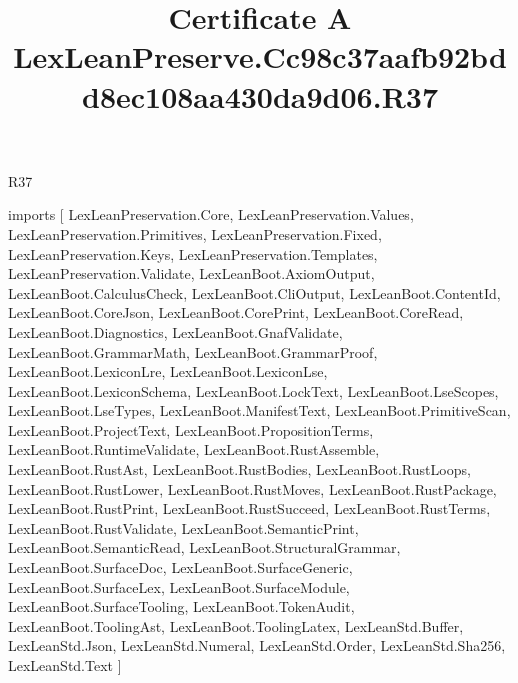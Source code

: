 \begin{lexlean}{R37}
\title{Certificate A LexLeanPreserve.Cc98c37aafb92bdd8ec108aa430da9d06.R37}
\begin{coremodule}
imports [
  LexLeanPreservation.Core,
  LexLeanPreservation.Values,
  LexLeanPreservation.Primitives,
  LexLeanPreservation.Fixed,
  LexLeanPreservation.Keys,
  LexLeanPreservation.Templates,
  LexLeanPreservation.Validate,
  LexLeanBoot.AxiomOutput,
  LexLeanBoot.CalculusCheck,
  LexLeanBoot.CliOutput,
  LexLeanBoot.ContentId,
  LexLeanBoot.CoreJson,
  LexLeanBoot.CorePrint,
  LexLeanBoot.CoreRead,
  LexLeanBoot.Diagnostics,
  LexLeanBoot.GnafValidate,
  LexLeanBoot.GrammarMath,
  LexLeanBoot.GrammarProof,
  LexLeanBoot.LexiconLre,
  LexLeanBoot.LexiconLse,
  LexLeanBoot.LexiconSchema,
  LexLeanBoot.LockText,
  LexLeanBoot.LseScopes,
  LexLeanBoot.LseTypes,
  LexLeanBoot.ManifestText,
  LexLeanBoot.PrimitiveScan,
  LexLeanBoot.ProjectText,
  LexLeanBoot.PropositionTerms,
  LexLeanBoot.RuntimeValidate,
  LexLeanBoot.RustAssemble,
  LexLeanBoot.RustAst,
  LexLeanBoot.RustBodies,
  LexLeanBoot.RustLoops,
  LexLeanBoot.RustLower,
  LexLeanBoot.RustMoves,
  LexLeanBoot.RustPackage,
  LexLeanBoot.RustPrint,
  LexLeanBoot.RustSucceed,
  LexLeanBoot.RustTerms,
  LexLeanBoot.RustValidate,
  LexLeanBoot.SemanticPrint,
  LexLeanBoot.SemanticRead,
  LexLeanBoot.StructuralGrammar,
  LexLeanBoot.SurfaceDoc,
  LexLeanBoot.SurfaceGeneric,
  LexLeanBoot.SurfaceLex,
  LexLeanBoot.SurfaceModule,
  LexLeanBoot.SurfaceTooling,
  LexLeanBoot.TokenAudit,
  LexLeanBoot.ToolingAst,
  LexLeanBoot.ToolingLatex,
  LexLeanStd.Buffer,
  LexLeanStd.Json,
  LexLeanStd.Numeral,
  LexLeanStd.Order,
  LexLeanStd.Sha256,
  LexLeanStd.Text
]


\end{coremodule}
\end{lexlean}

